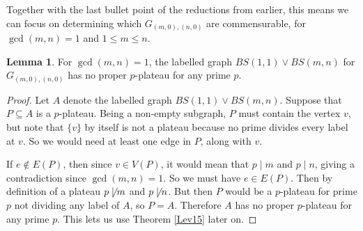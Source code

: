 \documentclass[10pt]{article}
\def\subs{\subseteq}
\theoremstyle{definition}
\newtheorem{lemma}{Lemma}
\begin{document}
Together with the last bullet point of the reductions from earlier, this means we can focus on determining which $G_{(m,0),(n,0)}$ are commensurable, for $\gcd(m,n)=1$ and $1\leq m \leq n$. 





\begin{lemma}\label{Gm0n0_no_proper_plateay}
    For $\gcd(m,n)=1$, the labelled graph $BS(1,1) \vee BS(m,n)$ for $G_{(m,0),(n,0)}$ has no proper $p$-plateau for any prime $p$.
\end{lemma}


\begin{proof}
Let $A$ denote the labelled graph $BS(1,1) \vee BS(m,n)$. Suppose that $P \subs A$ is a $p$-plateau. Being a non-empty subgraph, $P$ must contain the vertex $v$, but note that $\{v\}$ by itself is not a plateau because no prime divides every label at $v$. So we would need at least one edge in $P$, along with $v$. 

\begin{center}
\end{center}

If $e\not\in E(P)$, then since $v\in V(P)$, it would mean that $p \mid m$ and $p\mid n$, giving a contradiction since $\gcd(m,n)=1$. So we must have $e\in E(P)$.  Then by definition of a plateau $p \not\mid m$ and $p\not\mid n$. But then $P$ would be a $p$-plateau for prime $p$ not dividing any label of $A$, so $P=A$. Therefore $A$ has no proper $p$-plateau for any prime $p$. This lets us use Theorem \ref{Lev15} later on. 
\end{proof}
\end{document}
